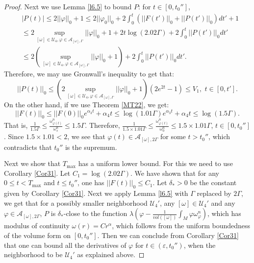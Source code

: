 \documentclass[11pt]{amsart}
\numberwithin{equation}{section}
\newcommand \eps{\varepsilon}
\begin{document}
\begin{proof}
Next we use Lemma \ref{l6.5} to bound $P$: for $t\in[0,t_0'']$,
\begin{equation*}
\begin{split}
&|P(t)|\le 2||\varphi||_0+1\le 2||\varphi_0||_0+2\int_0^t(||F(t')||_0+||P(t')||_0)dt'+1\\
&\le 2\sup_{[\omega]\in \mathcal{U}_4,\varphi\in \mathcal{A}_{[\omega],\Gamma}}||\varphi||_0+1+2t\log(2.02\Gamma)+2\int_0^t||P(t')||_0dt'\\
&\le 2(\sup_{[\omega]\in \mathcal{U}_4,\varphi\in \mathcal{A}_{[\omega],\Gamma}}||\varphi||_0+1)+2\int_0^t||P(t')||_0dt'.
\end{split}
\end{equation*}
Therefore,  we may use Gronwall's inequality to get that:
\begin{equation*}
||P(t)||_0\le (2\sup_{[\omega]\in \mathcal{U}_4,\varphi\in \mathcal{A}_{[\omega],\Gamma}}||\varphi||_0+1)(2e^{2t}-1)\le V_1,\,\,t\in [0,t'].
\end{equation*}
On the other hand,  if we use Theorem \ref{MT22},  we get:
\begin{equation*}
||F(t)||_0\le ||F(0)||_0e^{\alpha_3t}+\alpha_4t\le \log(1.01\Gamma)e^{\alpha_3t}+\alpha_4t\le \log(1.5\Gamma).
\end{equation*}
That is,  $\frac{1}{1.5\Gamma}\le \frac{\omega_{\varphi(t)}^n}{\omega_s^n}\le 1.5\Gamma$.  Therefore,  $\frac{1}{1.5\times 1.01\Gamma}\le \frac{\omega_{\varphi(t)}^n}{\omega_0^n}\le 1.5\times 1.01\Gamma$,  $t\in[0,t_0'']$.  Since $1.5\times 1.01<2$,  we see that $\varphi(t)\in \mathcal{A}_{[\omega],2\Gamma}$ for some $t>t_0''$,  which contradicts that $t_0''$ is the supremum.

Next we show that $T_{\max}$ has a uniform lower bound.  For this we need to use Corollary \ref{Cor31}.  Let $C_1=\log(2.02\Gamma)$.  We have shown that for any $0\le t<T_{\max}$ and $t\le t_0''$,  one has $||F(t)||_0\le C_1$.  Let $\delta_*>0$ be the constant given by Corollary \ref{Cor31}.  Next we apply Lemma \ref{l6.5} with $\Gamma$ replaced by $2\Gamma$,  we get that for a possibly smaller neighborhood $\mathcal{U}_4'$,  any $[\omega]\in \mathcal{U}_4'$ and any $\varphi\in \mathcal{A}_{[\omega],2\Gamma}$,  $P$ is $\delta_*$-close to the function $\lambda(\varphi-\frac{1}{vol([\omega])}\int_M\varphi\omega_{\varphi}^n)$,  which has modulus of continuity $\omega(r)=Cr^{\alpha}$,  which follows  from the uniform boundedness of the volume form on $[0,t_0'']$.  Then we can conclude from Corollary \ref{Cor31} that one can bound all the derivatives of $\varphi$ for $t\in (\eps,t_0'')$,  when the neighborhood to be $\mathcal{U}_4'$ as explained above.
\end{proof}
\end{document}
